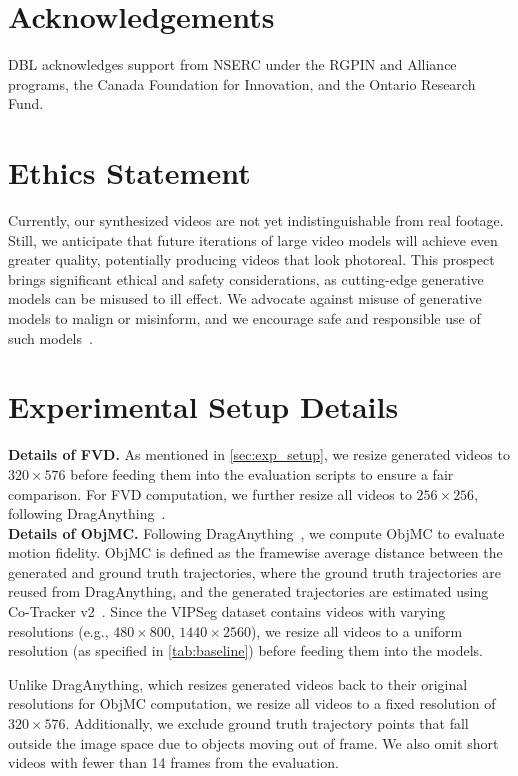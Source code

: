 \documentclass{article} \usepackage{iclr2025_conference,times}
\begin{document}
 \section*{Acknowledgements}
DBL acknowledges support from NSERC under the RGPIN and Alliance programs, the Canada Foundation for Innovation, and the Ontario Research Fund.

\section*{Ethics Statement}

Currently, our synthesized videos are not yet indistinguishable from real footage. Still, we anticipate that future iterations of large video models will achieve even greater quality, potentially producing videos that look photoreal. This prospect brings significant ethical and safety considerations, as cutting-edge generative models can be misused to ill effect. We advocate against misuse of generative models to malign or misinform, and we encourage safe and responsible use of such models~\citep{aisafety}.

 




\newpage
\appendix

\section{Experimental Setup Details}
\textbf{Details of FVD.} As mentioned in \cref{sec:exp_setup}, we resize generated videos to $320 \times 576$ before feeding them into the evaluation scripts to ensure a fair comparison. For FVD computation, we further resize all videos to $256 \times 256$, following DragAnything~\citep{wu2024draganything}.\\

\textbf{Details of ObjMC.} Following DragAnything~\citep{wu2024draganything}, we compute ObjMC to evaluate motion fidelity. ObjMC is defined as the framewise average distance between the generated and ground truth trajectories, where the ground truth trajectories are reused from DragAnything, and the generated trajectories are estimated using Co-Tracker v2~\citep{cotracker}. Since the VIPSeg dataset contains videos with varying resolutions (e.g., $480 \times 800$, $1440 \times 2560$), we resize all videos to a uniform resolution (as specified in \cref{tab:baseline}) before feeding them into the models.

Unlike DragAnything, which resizes generated videos back to their original resolutions for ObjMC computation, we resize all videos to a fixed resolution of $320 \times 576$. Additionally, we exclude ground truth trajectory points that fall outside the image space due to objects moving out of frame. We also omit short videos with fewer than 14 frames from the evaluation.
\end{document}
